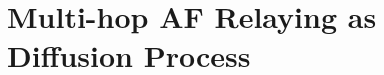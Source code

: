 \documentclass[journal]{IEEEtran}
\newtheorem{theorem}{Theorem}
\begin{document}









\section{Multi-hop AF Relaying as Diffusion Process}
\label{sec:af_system}
\end{document}
